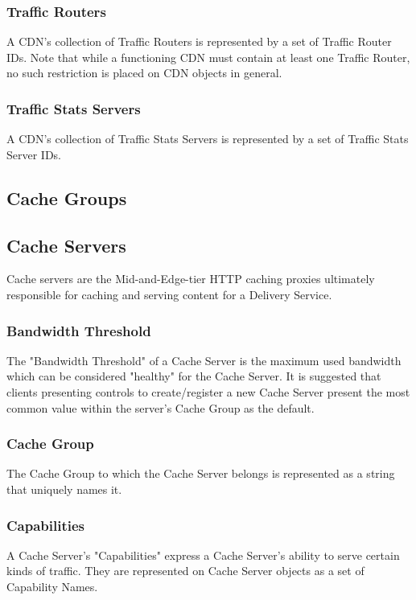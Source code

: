 \subsubsection{Traffic Routers}
A CDN's collection of Traffic Routers is represented by a set of Traffic Router
IDs. Note that while a functioning CDN must contain at least one Traffic Router,
no such restriction is placed on CDN objects in general.

\subsubsection{Traffic Stats Servers}
A CDN's collection of Traffic Stats Servers is represented by a set of Traffic
Stats Server IDs.



\subsection{Cache Groups}



\subsection{Cache Servers}
Cache servers are the Mid-and-Edge-tier HTTP caching proxies ultimately
responsible for caching and serving content for a Delivery Service.

\subsubsection{Bandwidth Threshold}
The "Bandwidth Threshold" of a Cache Server is the maximum used bandwidth which
can be considered "healthy" for the Cache Server. It is suggested that clients
presenting controls to create/register a new Cache Server present the most
common value within the server's Cache Group as the default.

\subsubsection{Cache Group}
The Cache Group to which the Cache Server belongs is represented as a string
that uniquely names it.

\subsubsection{Capabilities}
A Cache Server's "Capabilities" express a Cache Server's ability to serve
certain kinds of traffic. They are represented on Cache Server objects as a set
of Capability Names.

